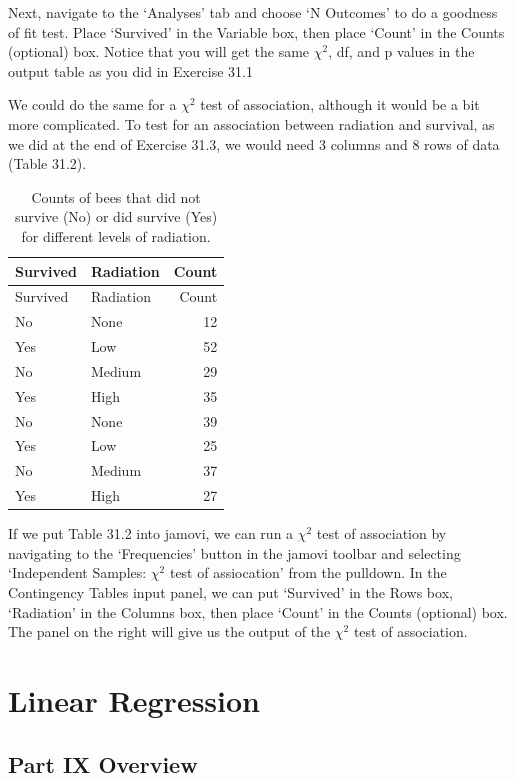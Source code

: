 \documentclass[
]{scrbook}
\begin{document}
Next, navigate to the `Analyses' tab and choose `N Outcomes' to do a goodness of fit test.
Place `Survived' in the Variable box, then place `Count' in the Counts (optional) box.
Notice that you will get the same \(\chi^{2}\), df, and p values in the output table as you did in Exercise 31.1

We could do the same for a \(\chi^{2}\) test of association, although it would be a bit more complicated.
To test for an association between radiation and survival, as we did at the end of Exercise 31.3, we would need 3 columns and 8 rows of data (Table 31.2).

\begin{longtable}[]{@{}llr@{}}
\caption{\label{tab:unnamed-chunk-160}Counts of bees that did not survive (No) or did survive (Yes) for different levels of radiation.}\tabularnewline
\toprule
Survived & Radiation & Count \\
\midrule
\endfirsthead
\toprule
Survived & Radiation & Count \\
\midrule
\endhead
No & None & 12 \\
Yes & Low & 52 \\
No & Medium & 29 \\
Yes & High & 35 \\
No & None & 39 \\
Yes & Low & 25 \\
No & Medium & 37 \\
Yes & High & 27 \\
\bottomrule
\end{longtable}

If we put Table 31.2 into jamovi, we can run a \(\chi^{2}\) test of association by navigating to the `Frequencies' button in the jamovi toolbar and selecting `Independent Samples: \(\chi^{2}\) test of assiocation' from the pulldown.
In the Contingency Tables input panel, we can put `Survived' in the Rows box, `Radiation' in the Columns box, then place `Count' in the Counts (optional) box.
The panel on the right will give us the output of the \(\chi^{2}\) test of association.

\hypertarget{part-linear-regression}{%
\part{Linear Regression}\label{part-linear-regression}}

\hypertarget{Week10}{%
\chapter*{Part IX Overview}\label{Week10}}
\end{document}

